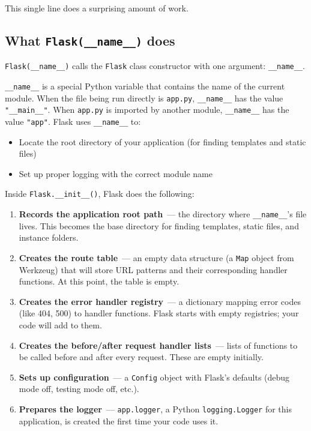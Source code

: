 \noindent{}This single line does a surprising amount of work.

\subsection*{\texorpdfstring{What \texttt{Flask(\_\_name\_\_)} does}{What Flask(\_\_name\_\_) does}}\label{02-runtime-initialization:what-flask--name---does}

\texttt{Flask(\_\_name\_\_)} calls the \texttt{Flask} class constructor with one argument: \texttt{\_\_name\_\_}.

\texttt{\_\_name\_\_} is a special Python variable that contains the name of the current module. When the file being run directly is \texttt{app.py}, \texttt{\_\_name\_\_} has the value \texttt{"\_\_main\_\_"}. When \texttt{app.py} is imported by another module, \texttt{\_\_name\_\_} has the value \texttt{"app"}. Flask uses \texttt{\_\_name\_\_} to:

\begin{itemize}
\tightlist
\item
  Locate the root directory of your application (for finding templates and static files)
\item
  Set up proper logging with the correct module name
\end{itemize}

\noindent{}Inside \texttt{Flask.\_\_init\_\_()}, Flask does the following:

\begin{enumerate}
\def\labelenumi{\arabic{enumi}.}
\item
  \textbf{Records the application root path}~--- the directory where \texttt{\_\_name\_\_}'s file lives. This becomes the base directory for finding templates, static files, and instance folders.
\item
  \textbf{Creates the route table}~--- an empty data structure (a \texttt{Map} object from Werkzeug) that will store URL patterns and their corresponding handler functions. At this point, the table is empty.
\item
  \textbf{Creates the error handler registry}~--- a dictionary mapping error codes (like 404, 500) to handler functions. Flask starts with empty registries; your code will add to them.
\item
  \textbf{Creates the before/after request handler lists}~--- lists of functions to be called before and after every request. These are empty initially.
\item
  \textbf{Sets up configuration}~--- a \texttt{Config} object with Flask's defaults (debug mode off, testing mode off, etc.).
\item
  \textbf{Prepares the logger}~--- \texttt{app.logger}, a Python \texttt{logging.Logger} for this application, is created the first time your code uses it.
\end{enumerate}

